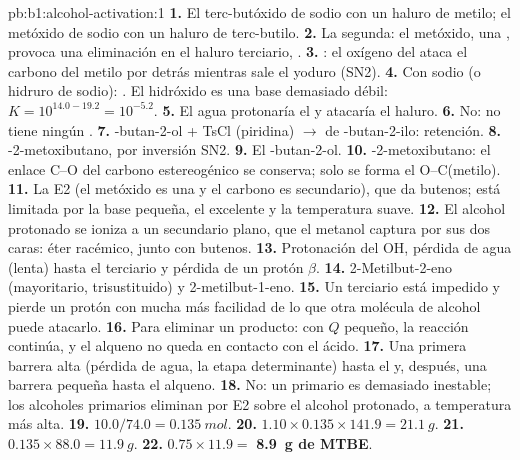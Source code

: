 \begin{solution}{pb:b1:alcohol-activation:1}
\textbf{1.} El terc-butóxido de sodio con un haluro de metilo; el
metóxido de sodio con un haluro de terc-butilo.
\textbf{2.} La segunda: el metóxido, una , provoca una
eliminación en el haluro terciario,
.
\textbf{3.} : el oxígeno del
 ataca el carbono del metilo por detrás mientras sale el yoduro
(SN2).
\textbf{4.} Con sodio (o hidruro de sodio): . El hidróxido es una base demasiado débil:
$K = 10^{14.0 -
19.2} = 10^{-5.2}$.
\textbf{5.} El agua protonaría el  y atacaría el haluro.
\textbf{6.} No: no tiene ningún .
\textbf{7.} -butan-2-ol + TsCl (piridina) $\to$  de
-butan-2-ilo: retención.
\textbf{8.} -2-metoxibutano, por inversión SN2.
\textbf{9.} El -butan-2-ol.
\textbf{10.} -2-metoxibutano: el enlace C--O del carbono
estereogénico se conserva; solo se forma el O--C(metilo).
\textbf{11.} La E2 (el metóxido es una  y el carbono es
secundario), que da butenos; está limitada por la base pequeña, el  excelente y la temperatura suave.
\textbf{12.} El alcohol protonado se ioniza a un  secundario
plano, que el metanol captura por sus dos caras: éter racémico, junto con
butenos.
\textbf{13.} Protonación del OH, pérdida de agua (lenta) hasta el
 terciario y pérdida de un protón $\beta$.
\textbf{14.} 2-Metilbut-2-eno (mayoritario, trisustituido) y
2-metilbut-1-eno.
\textbf{15.} Un  terciario está impedido y pierde un protón con
mucha más facilidad de lo que otra molécula de alcohol puede atacarlo.
\textbf{16.} Para eliminar un producto: con $Q$ pequeño, la reacción
continúa, y el alqueno no queda en contacto con el ácido.
\textbf{17.} Una primera barrera alta (pérdida de agua, la etapa
determinante) hasta el  y, después, una barrera pequeña hasta
el alqueno.
\textbf{18.} No: un  primario es demasiado inestable; los
alcoholes primarios eliminan por E2 sobre el alcohol protonado, a
temperatura más alta.
\textbf{19.} $10.0/74.0 = \qty{0.135}{mol}$.
\textbf{20.} $1.10 \times 0.135 \times 141.9 = \qty{21.1}{g}$.
\textbf{21.} $0.135 \times 88.0 = \qty{11.9}{g}$.
\textbf{22.} $0.75 \times 11.9 =$ \textbf{\qty{8.9}{g} de MTBE}.
\end{solution}
